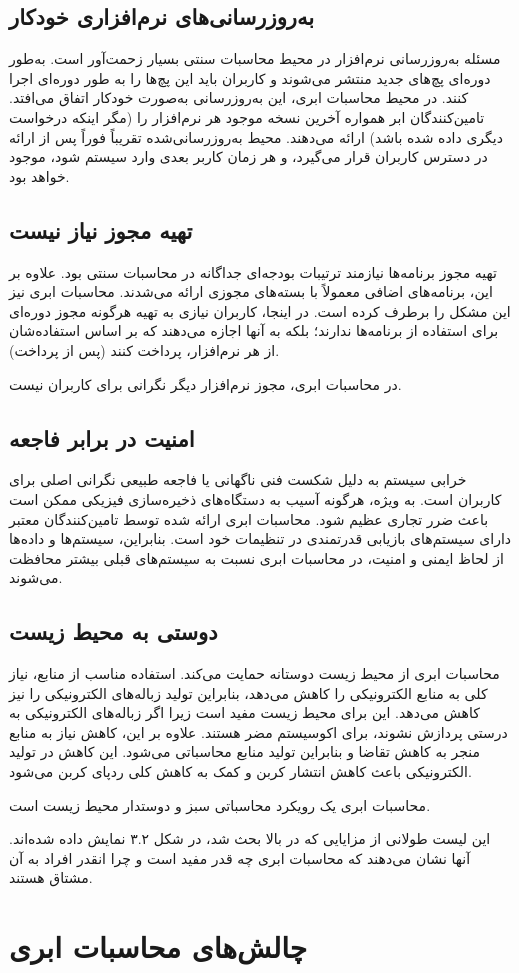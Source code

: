 \documentclass{book}
\begin{document}
    \subsection{به‌روزرسانی‌های نرم‌افزاری خودکار}
    مسئله به‌روزرسانی نرم‌افزار در محیط محاسبات سنتی بسیار زحمت‌آور است. به‌طور دوره‌ای پچ‌های جدید منتشر می‌شوند و کاربران باید این پچ‌ها را به طور دوره‌ای اجرا کنند. در محیط محاسبات ابری، این به‌روزرسانی به‌صورت خودکار اتفاق می‌افتد. تامین‌کنندگان ابر همواره آخرین نسخه موجود هر نرم‌افزار را (مگر اینکه درخواست دیگری داده شده باشد) ارائه می‌دهند. محیط به‌روزرسانی‌شده تقریباً فوراً پس از ارائه در دسترس کاربران قرار می‌گیرد، و هر زمان کاربر بعدی وارد سیستم شود، موجود خواهد بود.

    \subsection{تهیه مجوز نیاز نیست}
    تهیه مجوز برنامه‌ها نیازمند ترتیبات بودجه‌ای جداگانه در محاسبات سنتی بود. علاوه بر این، برنامه‌های اضافی معمولاً با بسته‌های مجوزی ارائه می‌شدند. محاسبات ابری نیز این مشکل را برطرف کرده است. در اینجا، کاربران نیازی به تهیه هرگونه مجوز دوره‌ای برای استفاده از برنامه‌ها ندارند؛ بلکه به آنها اجازه می‌دهند که بر اساس استفاده‌شان از هر نرم‌افزار، پرداخت کنند (پس از پرداخت).
    
    در محاسبات ابری، مجوز نرم‌افزار دیگر نگرانی برای کاربران نیست.

    \subsection{امنیت در برابر فاجعه}
    خرابی سیستم به دلیل شکست فنی ناگهانی یا فاجعه طبیعی نگرانی اصلی برای کاربران است. به ویژه، هرگونه آسیب به دستگاه‌های ذخیره‌سازی فیزیکی ممکن است باعث ضرر تجاری عظیم شود. محاسبات ابری ارائه شده توسط تامین‌کنندگان معتبر دارای سیستم‌های بازیابی قدرتمندی در تنظیمات خود است. بنابراین، سیستم‌ها و داده‌ها از لحاظ ایمنی و امنیت، در محاسبات ابری نسبت به سیستم‌های قبلی بیشتر محافظت می‌شوند.

    \subsection{دوستی به محیط زیست}
    محاسبات ابری از محیط زیست دوستانه حمایت می‌کند. استفاده مناسب از منابع، نیاز کلی به منابع الکترونیکی را کاهش می‌دهد، بنابراین تولید زباله‌های الکترونیکی را نیز کاهش می‌دهد. این برای محیط زیست مفید است زیرا اگر زباله‌های الکترونیکی به درستی پردازش نشوند، برای اکوسیستم مضر هستند. علاوه بر این، کاهش نیاز به منابع منجر به کاهش تقاضا و بنابراین تولید منابع محاسباتی می‌شود. این کاهش در تولید الکترونیکی باعث کاهش انتشار کربن و کمک به کاهش کلی ردپای کربن می‌شود.

    محاسبات ابری یک رویکرد محاسباتی سبز و دوستدار محیط زیست است.


    این لیست طولانی از مزایایی که در بالا بحث شد، در شکل ۳.۲ نمایش داده شده‌اند. آنها نشان می‌دهند که محاسبات ابری چه قدر مفید است و چرا انقدر افراد به آن مشتاق هستند.


    \section{چالش‌های محاسبات ابری}
\end{document}
